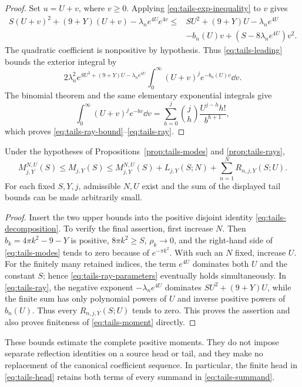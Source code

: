 \begin{proof}
Set $u=U+v$, where $v\ge0$. Applying
\eqref{eq:tails-exp-inequality} to $v$ gives
\begin{align*}
 S(U+v)^2+(9+Y)(U+v)-\lambda_ne^{4U}e^{4v}
 \le{}&SU^2+(9+Y)U-\lambda_ne^{4U}\\
 &-b_n(U)v+(S-8\lambda_ne^{4U})v^2.
\end{align*}
The quadratic coefficient is nonpositive by hypothesis. Thus
\eqref{eq:tails-leading} bounds the exterior integral by
\[
 2\lambda_n^2e^{SU^2+(9+Y)U-\lambda_ne^{4U}}
       \int_0^\infty(U+v)^je^{-b_n(U)v}\dd v.
\]
The binomial theorem and the same elementary exponential integrals give
\[
 \int_0^\infty(U+v)^je^{-bv}\dd v
 =\sum_{h=0}^{j}\binom{j}{h}
                  \frac{U^{j-h}h!}{b^{h+1}},
\]
which proves \eqref{eq:tails-ray-bound}--\eqref{eq:tails-ray}.
\end{proof}

\begin{corollary}\label{cor:tails-complete}
Under the hypotheses of Propositions~\ref{prop:tails-modes} and
\ref{prop:tails-rays},
\begin{equation}\label{eq:tails-complete}
 M^{N,U}_{j,Y}(S)\le M_{j,Y}(S)
 \le M^{N,U}_{j,Y}(S)+L_{j,Y}(S;N)
                       +\sum_{n=1}^{N}R_{n,j,Y}(S;U).
\end{equation}
For each fixed $S,Y,j$, admissible $N,U$ exist and the sum of the
displayed tail bounds can be made arbitrarily small.
\end{corollary}

\begin{proof}
Insert the two upper bounds into the positive disjoint identity
\eqref{eq:tails-decomposition}. To verify the final assertion, first
increase $N$. Then $b_k=4\pi k^2-9-Y$ is positive,
$8\pi k^2\ge S$, $\rho_k\to0$, and the right-hand side of
\eqref{eq:tails-modes} tends to zero because of $e^{-\pi k^2}$.
With such an $N$ fixed, increase $U$. For the finitely many retained
indices, the term $e^{4U}$ dominates both $U$ and the constant $S$;
hence \eqref{eq:tails-ray-parameters} eventually holds simultaneously.
In \eqref{eq:tails-ray}, the negative exponent
$-\lambda_ne^{4U}$ dominates $SU^2+(9+Y)U$, while the finite sum has
only polynomial powers of $U$ and inverse positive powers of $b_n(U)$.
Thus every $R_{n,j,Y}(S;U)$ tends to zero. This proves the assertion
and also proves finiteness of \eqref{eq:tails-moment} directly.
\end{proof}

These bounds estimate the complete positive moments. They do not impose
separate reflection identities on a source head or tail, and they make
no replacement of the canonical coefficient sequence. In particular, the
finite head in \eqref{eq:tails-head} retains both terms of every
summand in \eqref{eq:tails-summand}.
